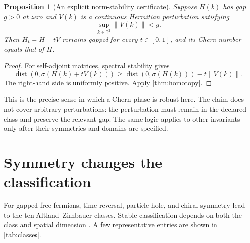 \documentclass[11pt]{article}
\newtheorem{proposition}[theorem]{Proposition}
\theoremstyle{definition}
\theoremstyle{remark}
\newcommand{\T}{\mathbb{T}}
\begin{document}
\begin{proposition}[An explicit norm-stability certificate]
\label{prop:norm}
Suppose \(H(k)\) has gap \(g>0\) at zero and \(V(k)\) is a continuous
Hermitian perturbation satisfying
\[
 \sup_{k\in\T^2}\|V(k)\|<g.
\]
Then \(H_t=H+tV\) remains gapped for every \(t\in[0,1]\), and its Chern
number equals that of \(H\).
\end{proposition}

\begin{proof}
For self-adjoint matrices, spectral stability gives
\[
 \operatorname{dist}(0,\sigma(H(k)+tV(k)))
 \geq
 \operatorname{dist}(0,\sigma(H(k)))-t\|V(k)\|.
\]
The right-hand side is uniformly positive.  Apply
\cref{thm:homotopy}.
\end{proof}

This is the precise sense in which a Chern phase is robust here.  The claim
does not cover arbitrary perturbations: the perturbation must remain in the
declared class and preserve the relevant gap.  The same logic applies to
other invariants only after their symmetries and domains are specified.

\section{Symmetry changes the classification}
\label{sec:symmetry}

For gapped free fermions, time-reversal, particle-hole, and chiral symmetry
lead to the ten Altland--Zirnbauer classes.  Stable classification depends on
both the class and spatial dimension
\cite{Schnyder2008,Kitaev2009,Ryu2010}.  A few representative entries are
shown in \cref{tab:classes}.
\end{document}

